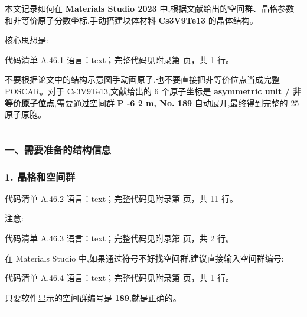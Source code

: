 \documentclass[lang=cn,scheme=chinese,color=blue,device=normal,toc=onecol,math=cm]{elegantbook}
\begin{document}
本文记录如何在 \textbf{Materials Studio 2023} 中,根据文献给出的空间群、晶格参数和非等价原子分数坐标,手动搭建块体材料 \textbf{Cs3V9Te13} 的晶体结构。\par


核心思想是:\par


\begin{codeindexbox}{代码清单 A.46.1}
语言：text；完整代码见附录第 \pageref{code:46:1} 页，共 1 行。
\end{codeindexbox}


不要根据论文中的结构示意图手动画原子,也不要直接把非等价位点当成完整 POSCAR。对于 Cs3V9Te13,文献给出的 6 个原子坐标是 \textbf{asymmetric unit /\allowbreak{} 非等价原子位点},需要通过空间群 \textbf{P -6 2 m, No. 189} 自动展开,最终得到完整的 25 原子原胞。\par


\medskip\hrule\medskip


\subsubsection{一、需要准备的结构信息}


\subsubsection{1. 晶格和空间群}


\begin{codeindexbox}{代码清单 A.46.2}
语言：text；完整代码见附录第 \pageref{code:46:2} 页，共 11 行。
\end{codeindexbox}


注意:\par


\begin{codeindexbox}{代码清单 A.46.3}
语言：text；完整代码见附录第 \pageref{code:46:3} 页，共 2 行。
\end{codeindexbox}


在 Materials Studio 中,如果通过符号不好找空间群,建议直接输入空间群编号:\par


\begin{codeindexbox}{代码清单 A.46.4}
语言：text；完整代码见附录第 \pageref{code:46:4} 页，共 1 行。
\end{codeindexbox}


只要软件显示的空间群编号是 \textbf{189},就是正确的。\par


\medskip\hrule\medskip
\end{document}
